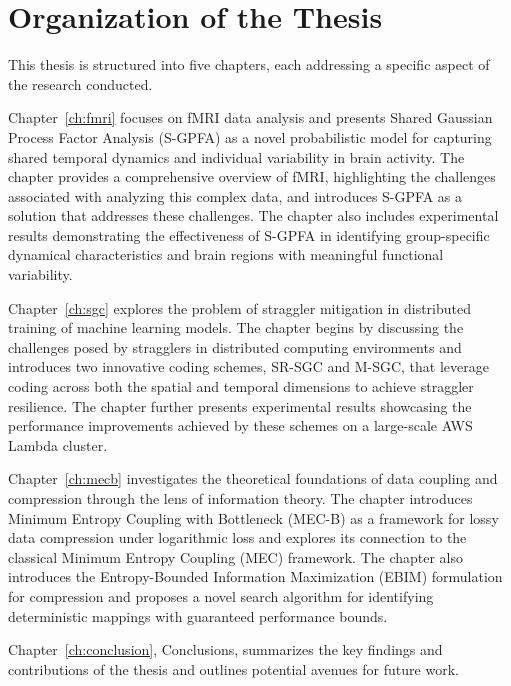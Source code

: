 \section{Organization of the Thesis}

This thesis is structured into five chapters, each addressing a specific aspect of the research conducted.

Chapter~\ref{ch:fmri} focuses on fMRI data analysis and presents Shared Gaussian Process Factor Analysis (S-GPFA) as a novel probabilistic model for capturing shared temporal dynamics and individual variability in brain activity. The chapter provides a comprehensive overview of fMRI, highlighting the challenges associated with analyzing this complex data, and introduces S-GPFA as a solution that addresses these challenges. The chapter also includes experimental results demonstrating the effectiveness of S-GPFA in identifying group-specific dynamical characteristics and brain regions with meaningful functional variability.

Chapter~\ref{ch:sgc} explores the problem of straggler mitigation in distributed training of machine learning models. The chapter begins by discussing the challenges posed by stragglers in distributed computing environments and introduces two innovative coding schemes, SR-SGC and M-SGC, that leverage coding across both the spatial and temporal dimensions to achieve straggler resilience. The chapter further presents experimental results showcasing the performance improvements achieved by these schemes on a large-scale AWS Lambda cluster.

Chapter~\ref{ch:mecb} investigates the theoretical foundations of data coupling and compression through the lens of information theory. The chapter introduces Minimum Entropy Coupling with Bottleneck (MEC-B) as a framework for lossy data compression under logarithmic loss and explores its connection to the classical Minimum Entropy Coupling (MEC) framework. The chapter also introduces the Entropy-Bounded Information Maximization (EBIM) formulation for compression and proposes a novel search algorithm for identifying deterministic mappings with guaranteed performance bounds. 

Chapter~\ref{ch:conclusion}, Conclusions, summarizes the key findings and contributions of the thesis and outlines potential avenues for future work. 